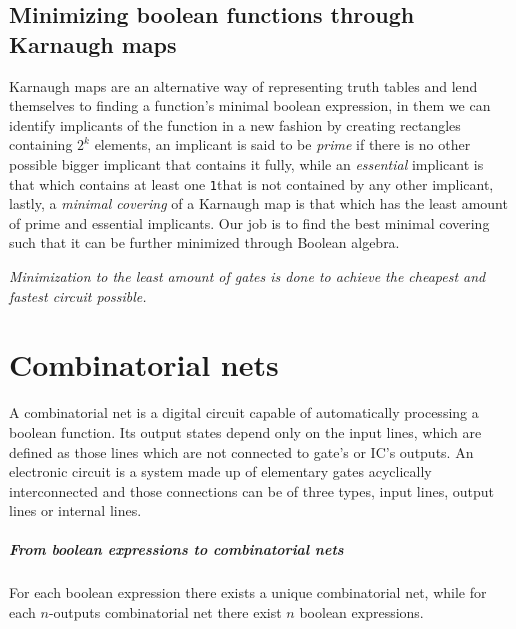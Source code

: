 \documentclass{scrartcl}
\newcommand{\one}{\texttt{1}}
\begin{document}
    \subsection{Minimizing boolean functions through Karnaugh maps} Karnaugh maps are an alternative way of representing truth tables and lend themselves to finding a function's minimal boolean expression, in them we can identify implicants of the function in a new fashion by creating rectangles containing $2^k$ elements, an implicant is said to be \emph{prime} if there is no other possible bigger implicant that contains it fully, while an \emph{essential} implicant is that which contains at least one \one that is not contained by any other implicant, lastly, a \emph{minimal covering} of a Karnaugh map is that which has the least amount of prime and essential implicants. Our job is to find the best minimal covering such that it can be further minimized through Boolean algebra.

    \emph{Minimization to the least amount of gates is done to achieve the cheapest and fastest circuit possible.}
    \section{Combinatorial nets}
    A combinatorial net is a digital circuit capable of automatically processing a boolean function. Its output states depend only on the input lines, which are defined as those lines which are not connected to gate's or IC's outputs. An electronic circuit is a system made up of elementary gates acyclically interconnected and those connections can be of three types, input lines, output lines or internal lines.
    \subparagraph{From boolean expressions to combinatorial nets} For each boolean expression there exists a unique combinatorial net, while for each $n$-outputs combinatorial net there exist $n$ boolean expressions.
\end{document}
